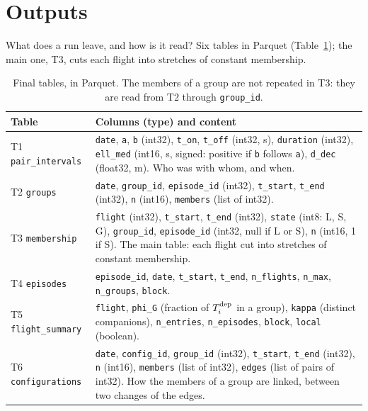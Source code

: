 \section{Outputs}\label{sec:outputs}

What does a run leave, and how is it read? Six tables in Parquet (Table~\ref{tab:outputs});
the main one, T3, cuts each flight into stretches of constant membership.

\begin{table}
\centering
\small
\begin{tabularx}{\textwidth}{@{}l X@{}}
\toprule
Table & Columns (type) and content \\
\midrule
T1 \texttt{pair\_intervals} & \texttt{date}, \texttt{a}, \texttt{b} (int32), \texttt{t\_on}, \texttt{t\_off} (int32, s),
  \texttt{duration} (int32), \texttt{ell\_med} (int16, s, signed: positive if \texttt{b} follows \texttt{a}),
  \texttt{d\_dec} (float32, m). Who was with whom, and when. \\ \addlinespace
T2 \texttt{groups} & \texttt{date}, \texttt{group\_id}, \texttt{episode\_id} (int32), \texttt{t\_start},
  \texttt{t\_end} (int32), \texttt{n} (int16), \texttt{members} (list of int32). \\ \addlinespace
T3 \texttt{membership} & \texttt{flight} (int32), \texttt{t\_start}, \texttt{t\_end} (int32), \texttt{state} (int8:
  L, S, G), \texttt{group\_id}, \texttt{episode\_id} (int32, null if L or S), \texttt{n} (int16, 1 if S).
  The main table: each flight cut into stretches of constant membership. \\ \addlinespace
T4 \texttt{episodes} & \texttt{episode\_id}, \texttt{date}, \texttt{t\_start}, \texttt{t\_end}, \texttt{n\_flights},
  \texttt{n\_max}, \texttt{n\_groups}, \texttt{block}. \\ \addlinespace
T5 \texttt{flight\_summary} & \texttt{flight}, \texttt{phi\_G} (fraction of $T^{\mathrm{dep}}_i$ in a group), \texttt{kappa}
  (distinct companions), \texttt{n\_entries}, \texttt{n\_episodes}, \texttt{block}, \texttt{local} (boolean). \\ \addlinespace
T6 \texttt{configurations} & \texttt{date}, \texttt{config\_id}, \texttt{group\_id} (int32), \texttt{t\_start},
  \texttt{t\_end} (int32), \texttt{n} (int16), \texttt{members} (list of int32), \texttt{edges} (list of
  pairs of int32). How the members of a group are linked, between two changes of the edges. \\
\bottomrule
\end{tabularx}
\caption{Final tables, in Parquet. The members of a group are not repeated in T3: they are read
from T2 through \texttt{group\_id}.}
\label{tab:outputs}
\end{table}

